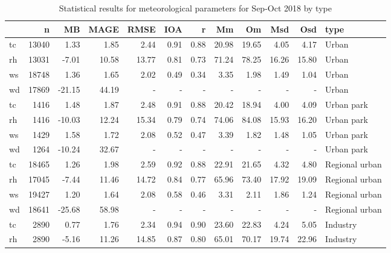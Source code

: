 \begin{table}
\centering
\caption{Statistical results for meteorological parameters for Sep-Oct 2018 by type}
\label{tab:stats_all_type}
\begin{tabular}{lrrrrrrrrrrl}
\toprule
{} &      n &     MB &   MAGE &   RMSE &   IOA &     r &     Mm &     Om &    Msd &    Osd &                 type \\
\midrule
tc &  13040 &   1.33 &   1.85 &   2.44 &  0.91 &  0.88 &  20.98 &  19.65 &   4.05 &   4.17 &                Urban \\
rh &  13031 &  -7.01 &  10.58 &  13.77 &  0.81 &  0.73 &  71.24 &  78.25 &  16.26 &  15.80 &                Urban \\
ws &  18748 &   1.36 &   1.65 &   2.02 &  0.49 &  0.34 &   3.35 &   1.98 &   1.49 &   1.04 &                Urban \\
wd &  17869 & -21.15 &  44.19 &      - &     - &     - &      - &      - &      - &      - &                Urban \\
tc &   1416 &   1.48 &   1.87 &   2.48 &  0.91 &  0.88 &  20.42 &  18.94 &   4.00 &   4.09 &           Urban park \\
rh &   1416 & -10.03 &  12.24 &  15.34 &  0.79 &  0.74 &  74.06 &  84.08 &  15.93 &  16.20 &           Urban park \\
ws &   1429 &   1.58 &   1.72 &   2.08 &  0.52 &  0.47 &   3.39 &   1.82 &   1.48 &   1.05 &           Urban park \\
wd &   1264 & -10.24 &  32.67 &      - &     - &     - &      - &      - &      - &      - &           Urban park \\
tc &  18465 &   1.26 &   1.98 &   2.59 &  0.92 &  0.88 &  22.91 &  21.65 &   4.32 &   4.80 &       Regional urban \\
rh &  17045 &  -7.44 &  11.46 &  14.72 &  0.84 &  0.77 &  65.96 &  73.40 &  17.92 &  19.09 &       Regional urban \\
ws &  19427 &   1.20 &   1.64 &   2.08 &  0.58 &  0.46 &   3.31 &   2.11 &   1.86 &   1.24 &       Regional urban \\
wd &  18641 & -25.68 &  58.98 &      - &     - &     - &      - &      - &      - &      - &       Regional urban \\
tc &   2890 &   0.77 &   1.76 &   2.34 &  0.94 &  0.90 &  23.60 &  22.83 &   4.24 &   5.05 &             Industry \\
rh &   2890 &  -5.16 &  11.26 &  14.85 &  0.87 &  0.80 &  65.01 &  70.17 &  19.74 &  22.96 &             Industry \\

\end{tabular}
\end{table}
